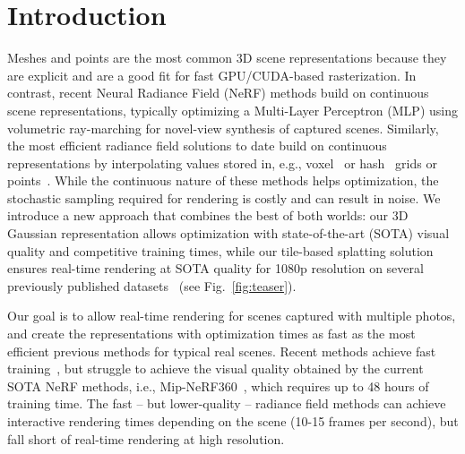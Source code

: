\section{Introduction}

Meshes and points are the most common 3D scene representations because they are explicit and are a good fit for fast GPU/CUDA-based rasterization. 
In contrast, recent Neural Radiance Field (NeRF) methods build on continuous scene representations, typically optimizing a Multi-Layer Perceptron (MLP) using volumetric ray-marching for novel-view synthesis of captured scenes. Similarly, the most efficient radiance field solutions to date build on continuous representations by interpolating values stored in, e.g., voxel~\cite{plenoxels} or hash~\cite{mueller2022instant} grids or points~\cite{xu2022point}.
While the continuous nature of these methods helps optimization, the stochastic sampling required for rendering is costly and can result in noise.
We introduce a new approach that combines the best of both worlds: our 3D Gaussian representation allows optimization with state-of-the-art (SOTA) visual quality and competitive training times, 
while our tile-based splatting solution ensures real-time rendering at SOTA quality for 1080p resolution on several previously published datasets~\cite{knapitsch2017tanks,hedman2018deep,barron2022mipnerf360} (see Fig.~\ref{fig:teaser}).


Our goal is to allow real-time rendering for scenes captured with multiple photos, and create the representations with optimization times as fast as the most efficient previous methods for typical real scenes.
Recent methods achieve fast training~\cite{plenoxels,mueller2022instant}, but struggle to achieve the visual quality obtained by the current SOTA NeRF methods, i.e., Mip-NeRF360~\cite{barron2022mipnerf360}, which requires up to 48 hours of training time. The fast -- but lower-quality -- radiance field methods can achieve interactive rendering times depending on the scene (10-15 frames per second), but fall short of real-time rendering  at high resolution.

